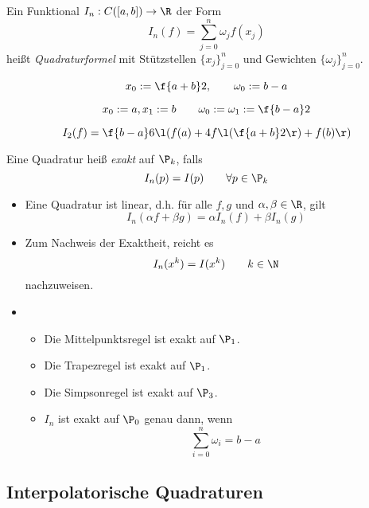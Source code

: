 \documentclass[11pt]{scrartcl}
\begin{document}
\begin{df}[Quadratur]
	\label{2.1}
	Ein Funktional $I_n : C([a,b]) \to \R$ der Form
	\[
		I_n(f) = \sum_{j=0}^n \omega_j f(x_j)
	\]
	heißt \emph{Quadraturformel} mit Stützstellen $\{x_j\}_{j=0}^n$ und Gewichten $\{\omega_j\}_{j=0}^n$.
\end{df}

\begin{ex*}
	\begin{seg}[Mittelpunktsregel ($n=0$)]
		\[
			x_0 := \f {a+b}2, \qquad \omega_0 := b-a
		\]				
	\end{seg}
	\begin{seg}[Trapezregel ($n=1$)]
		\[
			x_0 := a, x_1 := b \qquad \omega_0 := \omega_1 := \f {b-a}2
		\]				
	\end{seg}
	\begin{seg}[Simpsonregel ($n=2$)]
		\[
			I_2(f) = \f {b-a}6 \l( f(a) + 4f\l(\f {a+b}2\r) + f(b) \r)
		\]
	\end{seg}
\end{ex*}

\begin{df}[Exaktheit]
	\label{2.2}
	Eine Quadratur heiß \emph{exakt} auf $\P_k$, falls
	\[
		I_n(p) = I(p) \qquad \forall p\in \P_k
	\]
\end{df}

\begin{nt*}
	\begin{itemize}
		\item
			Eine Quadratur ist linear, d.h. für alle $f,g$ und $\alpha,\beta \in \R$, gilt
			\[
				I_n ( \alpha f + \beta g) = \alpha I_n(f) + \beta I_n(g)
			\]
		\item
			Zum Nachweis der Exaktheit, reicht es
			\[
				I_n(x^k) = I(x^k) \qquad k\in \N
			\]
			nachzuweisen.
		\item
			\begin{itemize}
				\item
					Die Mittelpunktsregel ist exakt auf $\P_1$.
				\item
					Die Trapezregel ist exakt auf $\P_1$.
				\item
					Die Simpsonregel ist exakt auf $\P_3$.
				\item
					$I_n$ ist exakt auf $\P_0$ genau dann, wenn
					\[
						\sum_{i=0}^n \omega_i = b-a
					\]
			\end{itemize}
	\end{itemize}
\end{nt*}


\subsection{Interpolatorische Quadraturen}
\end{document}
